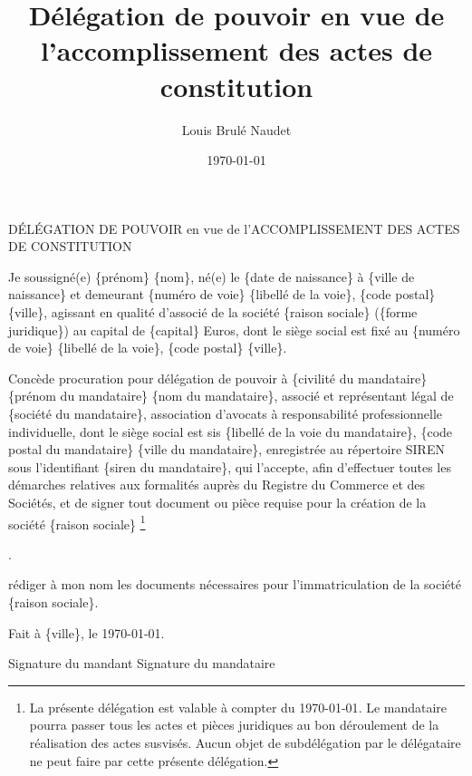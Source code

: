 \documentclass[french, 12pt]{report}
\title{Délégation de pouvoir en vue de l'accomplissement des actes de constitution}
\author{Louis Brulé Naudet}
\date{\today}
\newcommand\blfootnote[1]{%
  \begingroup
  \renewcommand\thefootnote{}\footnote{#1}%
  \addtocounter{footnote}{-1}%
  \endgroup
}
\begin{document}
\begin{center}
\LARGE{DÉLÉGATION DE POUVOIR en vue de l'ACCOMPLISSEMENT DES ACTES DE CONSTITUTION}
\end{center}
\vspace{1cm}

Je soussigné(e) \{{prénom}\} \{{nom}\}, né(e) le \{{date de naissance}\} à \{{ville de naissance}\} et demeurant \{{numéro de voie}\} \{{libellé de la voie}\}, \{{code postal}\} \{{ville}\}, agissant en qualité d'associé de la société \{{raison sociale}\} (\{{forme juridique}\}) au capital de \{{capital}\} Euros, dont le siège social est fixé au \{{numéro de voie}\} \{{libellé de la voie}\}, \{{code postal}\} \{{ville}\}.\par

Concède procuration pour délégation de pouvoir à \{{civilité du mandataire}\} \{{prénom du mandataire}\} \{{nom du mandataire}\}, associé et représentant légal de \{{société du mandataire}\}, association d'avocats à responsabilité professionnelle individuelle, dont le siège social est sis \{{libellé de la voie du mandataire}\}, \{{code postal du mandataire}\} \{{ville du mandataire}\}, enregistrée au répertoire SIREN sous l'identifiant \{{siren du mandataire}\}, qui l'accepte, afin d'effectuer toutes les démarches relatives aux formalités auprès du Registre du Commerce et des Sociétés, et de signer tout document ou pièce requise pour la création de la société \{{raison sociale}\}\blfootnote{La présente délégation est valable à compter du {\today}. Le mandataire pourra passer tous les actes et pièces juridiques au bon déroulement de la réalisation des actes susvisés. Aucun objet de subdélégation par le délégataire ne peut faire par cette présente délégation.}.

rédiger à mon nom les documents nécessaires pour l'immatriculation de la société \{{raison sociale}\}.\par

Fait à \{{ville}\}, le {\today}.\par
Signature du mandant
\hspace*{3cm}Signature du mandataire
\end{document}
